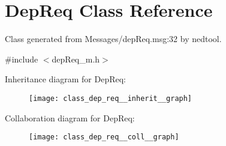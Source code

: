 \hypertarget{class_dep_req}{}\section{Dep\+Req Class Reference}
\label{class_dep_req}


Class generated from {\ttfamily Messages/dep\+Req.\+msg\+:32} by nedtool.  




{\ttfamily \#include $<$dep\+Req\+\_\+m.\+h$>$}



Inheritance diagram for Dep\+Req\+:\nopagebreak
\begin{figure}[H]
\begin{center}
\leavevmode
\texttt{[image: class\_dep\_req\_\_inherit\_\_graph]}
\end{center}
\end{figure}


Collaboration diagram for Dep\+Req\+:\nopagebreak
\begin{figure}[H]
\begin{center}
\leavevmode
\texttt{[image: class\_dep\_req\_\_coll\_\_graph]}
\end{center}
\end{figure}
